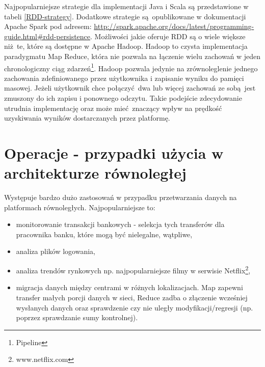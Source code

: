 Najpopularniejsze strategie dla implementacji Java i Scala są przedstawione w tabeli \ref{RDD-strategy}. Dodatkowe strategie są opublikowane w dokumentacji Apache Spark pod adresem: \url{http://spark.apache.org/docs/latest/programming-guide.html#rdd-persistence}. Możliwości jakie oferuje RDD są o wiele większe niż te, które są dostępne w Apache Hadoop. Hadoop to czysta implementacja paradygmatu Map Reduce, która nie pozwala na łączenie wielu zachowań w jeden chronologiczny ciąg zdarzeń\footnote{Pipeline}. Hadoop pozwala jedynie na zrównoleglenie jednego zachowania zdefiniowanego przez użytkownika i zapisanie wyniku do pamięci masowej. Jeżeli użytkownik chce połączyć dwa lub więcej zachowań ze sobą jest zmuszony do ich zapisu i ponownego odczytu. Takie podejście zdecydowanie utrudnia implementację oraz może mieć znaczący wpływ na prędkość uzyskiwania wyników dostarczanych przez platformę. 

\section{Operacje - przypadki użycia w architekturze równoległej}
Występuje bardzo dużo zastosowań w przypadku przetwarzania danych na platformach równoległych. Najpopularniejsze to:
\begin{itemize}
	\item monitorowanie transakcji bankowych - selekcja tych transferów dla pracownika banku, które mogą być nielegalne, wątpliwe,
	\item analiza plików logowania,
	\item analiza trendów rynkowych np. najpopularniejsze filmy w serwisie Netflix\footnote{www.netflix.com},
	\item migracja danych między centrami w różnych lokalizacjach. Map zapewni transfer małych porcji danych w sieci, Reduce zadba o złączenie wcześniej wysłanych danych oraz sprawdzenie czy nie uległy modyfikacji/regresji (np. poprzez sprawdzanie sumy kontrolnej). 
\end{itemize}